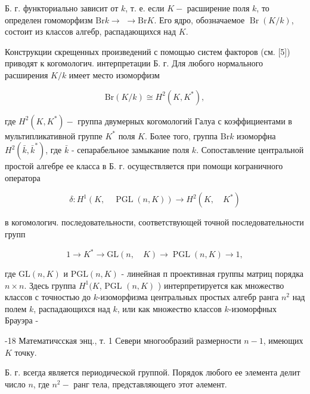 \documentclass[10pt]{article}
\begin{document}
Б. г. функториально зависит от $k$, т. е. если $K-$ расширение поля $k$, то определен гомоморфизм $\mathrm{Br} k \rightarrow$ $\rightarrow \mathrm{Br} K$. Его ядро, обозначаемое $\operatorname{Br}(K / k)$, состоит из классов алгебр, распадающихся над $K$.



Конструкции скрещенных произведений с помощью систем факторов (см. [5]) приводят к когомологич. интерпретации Б. г. Для любого нормального расширения $K / k$ имеет место изоморфизм



\[

\mathrm{Br}(K / k) \cong H^{2}\left(K, K^{*}\right),

\]



где $H^{2}\left(K, K^{*}\right)-$ группа двумерных когомологий Галуа с коэффициентами в мультипликативной группе $K^{*}$ поля $K$. Более того, группа $\mathrm{Br} k$ изоморфна $H^{2}\left(\bar{k}, \bar{k}^{*}\right)$, где $\bar{k}$ - сепарабельное замыкание поля $k$. Сопоставление центральной простой алгебре ее класса в Б. г. осуществляется при помощи кограничного оператора



\[

\delta: H^{1}(K, \quad \operatorname{PGL}(n, K)) \rightarrow H^{2}\left(K, \quad K^{*}\right)

\]



в когомологич. последовательности, соответствующей точной последовательности групп



\[

1 \rightarrow K^{*} \rightarrow \mathrm{GL}(n, \quad K) \rightarrow \operatorname{PGL}(n, K) \rightarrow 1,

\]



где $\mathrm{GL}(n, K)$ и $\mathrm{PGL}(n, K)$ - линейная п проективная группы матриц порядка $n \times n$. Здесь группа $H^{1}(K$, PGL $(n, K)$ ) интерпретируется как множество классов с точностью до $k$-изоморфизма центральных простых алгебр ранга $n^{2}$ над полем $k$, распадающихся над $k$, или как множество классов $k$-изоморфных Брауэра -



-18 Математичсская энц., т. 1 Севери многообразий размерности $n-1$, имеющих $K$ точку.



Б. г. всегда является периодической группой. Порядок любого ее элемента делит число $n$, где $n^{2}-$ ранг тела, представляющего этот әлемент.
\end{document}
